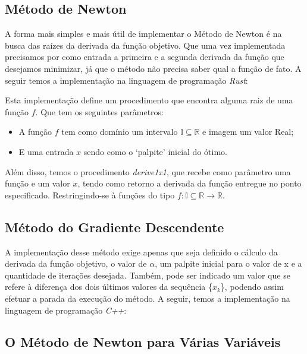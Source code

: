 
\hspace{0.8cm}
\subsection{Método de Newton}

\hspace{0.8cm}
A forma mais simples e mais útil de implementar o Método de Newton é na
busca das raízes da derivada da função objetivo. Que uma vez implementada
precisamos por como entrada a primeira e a segunda derivada da função que
desejamos minimizar, já que o método não precisa saber qual a função de fato.
A seguir temos a implementação na linguagem de programação \textit{Rust}:
\vspace{0.2cm}


Esta implementação define um procedimento que encontra alguma raiz de uma função
$f$. Que tem os seguintes parâmetros:

    \begin{itemize}
        \item A função $f$ tem como domínio um intervalo
            \(\mathbb{I} \subseteq \mathbb{R}\) e imagem um valor Real;

        \item E uma entrada $x$ sendo como o `palpite' inicial do ótimo.
    \end{itemize}


Além disso, temos o procedimento \textit{derive1x1}, que recebe como parâmetro
uma função e um valor $x$, tendo como retorno a derivada da função entregue
no ponto especificado. Restringindo-se à funções do tipo
\(f : \mathbb{I} \subseteq \mathbb{R} \rightarrow \mathbb{R}\).


\subsection{Método do Gradiente Descendente}

\hspace{0.8cm}
A implementação desse método exige apenas que seja definido o cálculo
da derivada da função objetivo, o valor de $\alpha$, um palpite inicial para
o valor de x e a quantidade de iterações desejada. Também, pode ser
indicado um valor que se refere à diferença dos dois últimos valores
da sequência \{$x_k$\}, podendo assim efetuar a parada da execução do
método. A seguir, temos a implementação na linguagem de programação
\textit{C++}:

\vspace{0.2cm}



\textcolor[rgb]{1,0,0}{\section{{O Método de Newton para Várias Variáveis}}}
